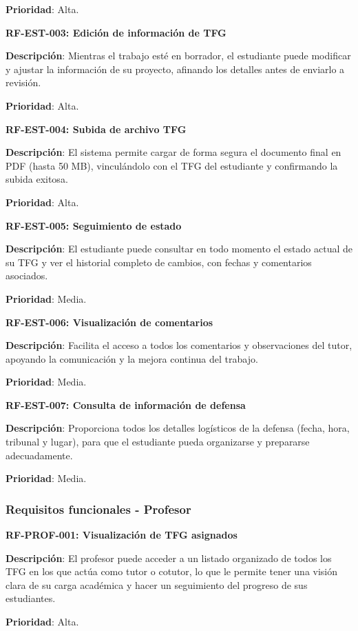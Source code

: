 \documentclass[12pt,a4paper,oneside]{report}
\begin{document}
\textbf{Prioridad}: Alta.

\textbf{RF-EST-003: Edición de información de TFG}

\textbf{Descripción}: Mientras el trabajo esté en borrador, el estudiante puede modificar y ajustar la información de su proyecto, afinando los detalles antes de enviarlo a revisión.

\textbf{Prioridad}: Alta.

\textbf{RF-EST-004: Subida de archivo TFG}

\textbf{Descripción}: El sistema permite cargar de forma segura el documento final en PDF (hasta 50 MB), vinculándolo con el TFG del estudiante y confirmando la subida exitosa.

\textbf{Prioridad}: Alta.

\textbf{RF-EST-005: Seguimiento de estado}

\textbf{Descripción}: El estudiante puede consultar en todo momento el estado actual de su TFG y ver el historial completo de cambios, con fechas y comentarios asociados.

\textbf{Prioridad}: Media.

\textbf{RF-EST-006: Visualización de comentarios}

\textbf{Descripción}: Facilita el acceso a todos los comentarios y observaciones del tutor, apoyando la comunicación y la mejora continua del trabajo.

\textbf{Prioridad}: Media.

\textbf{RF-EST-007: Consulta de información de defensa}

\textbf{Descripción}: Proporciona todos los detalles logísticos de la defensa (fecha, hora, tribunal y lugar), para que el estudiante pueda organizarse y prepararse adecuadamente.

\textbf{Prioridad}: Media.

\subsubsection{Requisitos funcionales -
Profesor}\label{requisitos-funcionales---profesor}

\textbf{RF-PROF-001: Visualización de TFG asignados}

\textbf{Descripción}: El profesor puede acceder a un listado organizado de todos los TFG en los que actúa como tutor o cotutor, lo que le permite tener una visión clara de su carga académica y hacer un seguimiento del progreso de sus estudiantes.

\textbf{Prioridad}: Alta.
\end{document}
